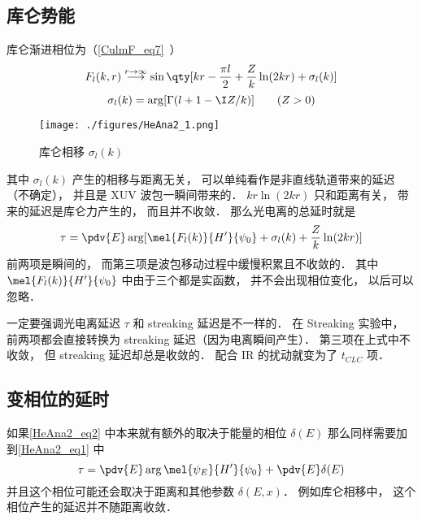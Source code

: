 \subsection{库仑势能}
库仑渐进相位为（\autoref{CulmF_eq7}~）
\begin{equation}
F_l(k, r) \overset{r\to \infty}{\longrightarrow} \sin\qty[kr - \frac{\pi l}{2} + \frac{Z}{k}\ln(2kr) + \sigma_l(k)] %
\end{equation}
\begin{equation}
\sigma_l(k) = \arg[\Gamma(l+1-\I Z/k)] \qquad (Z > 0)
\end{equation}
\begin{figure}[ht]
\centering
\texttt{[image: ./figures/HeAna2\_1.png]}
\caption{库仑相移 $\sigma_l(k)$} \label{HeAna2_fig1}
\end{figure}
其中 $\sigma_l(k)$ 产生的相移与距离无关， 可以单纯看作是非直线轨道带来的延迟（不确定）， 并且是 XUV 波包一瞬间带来的． $kr\ln(2kr)$ 只和距离有关， 带来的延迟是库仑力产生的， 而且并不收敛． 那么光电离的总延时就是
\begin{equation}
\tau = \pdv{E} \arg[\mel{F_l(k)}{H'}{\psi_0} + \sigma_l(k) + \frac{Z}{k}\ln(2kr)] %
\end{equation}
前两项是瞬间的， 而第三项是波包移动过程中缓慢积累且不收敛的． 其中 $\mel{F_l(k)}{H'}{\psi_0}$ 中由于三个都是实函数， 并不会出现相位变化， 以后可以忽略．

一定要强调光电离延迟 $\tau$ 和 streaking 延迟是不一样的． 在 Streaking 实验中， 前两项都会直接转换为 streaking 延迟（因为电离瞬间产生）． 第三项在上式中不收敛， 但 streaking 延迟却总是收敛的． 配合 IR 的扰动就变为了 $t_{CLC}$ 项．

\subsection{变相位的延时}

如果\autoref{HeAna2_eq2} 中本来就有额外的取决于能量的相位 $\delta(E)$ 那么同样需要加到\autoref{HeAna2_eq1} 中
\begin{equation}
\tau = \pdv{E} \arg \mel{\psi_E}{H'}{\psi_0} + \pdv{E} \delta(E)
\end{equation}
并且这个相位可能还会取决于距离和其他参数 $\delta(E, x)$． 例如库仑相移中， 这个相位产生的延迟并不随距离收敛．

